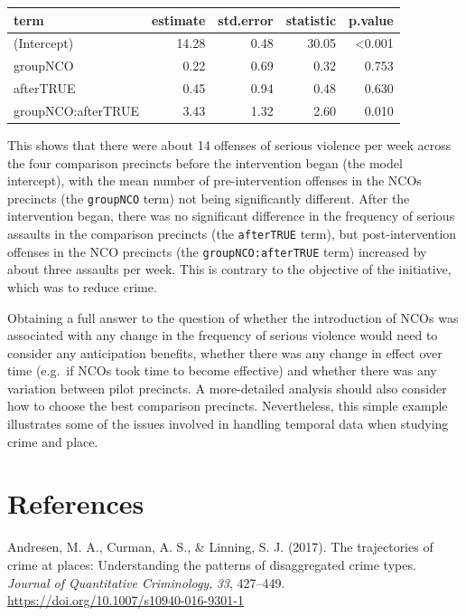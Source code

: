 \documentclass[
  english,
  man,a4paper,mask,floatsintext]{apa6}
\begin{document}
\begin{tabular}{lrrrr}
\toprule
term & estimate & std.error & statistic & p.value\\
\midrule
(Intercept) & 14.28 & 0.48 & 30.05 & <0.001\\
groupNCO & 0.22 & 0.69 & 0.32 & 0.753\\
afterTRUE & 0.45 & 0.94 & 0.48 & 0.630\\
groupNCO:afterTRUE & 3.43 & 1.32 & 2.60 & 0.010\\
\bottomrule
\end{tabular}

\normalsize

This shows that there were about 14 offenses of serious violence per week across the four comparison precincts before the intervention began (the model intercept), with the mean number of pre-intervention offenses in the NCOs precincts (the \texttt{groupNCO} term) not being significantly different. After the intervention began, there was no significant difference in the frequency of serious assaults in the comparison precincts (the \texttt{afterTRUE} term), but post-intervention offenses in the NCO precincts (the \texttt{groupNCO:afterTRUE} term) increased by about three assaults per week. This is contrary to the objective of the initiative, which was to reduce crime.

Obtaining a full answer to the question of whether the introduction of NCOs was associated with any change in the frequency of serious violence would need to consider any anticipation benefits, whether there was any change in effect over time (e.g.~if NCOs took time to become effective) and whether there was any variation between pilot precincts. A more-detailed analysis should also consider how to choose the best comparison precincts. Nevertheless, this simple example illustrates some of the issues involved in handling temporal data when studying crime and place.

\hypertarget{references}{%
\section{References}\label{references}}

\footnotesize

\hypertarget{refs}{}
\leavevmode\hypertarget{ref-Andresen:2017aa}{}%
Andresen, M. A., Curman, A. S., \& Linning, S. J. (2017). The trajectories of crime at places: Understanding the patterns of disaggregated crime types. \emph{Journal of Quantitative Criminology}, \emph{33}, 427--449. \url{https://doi.org/10.1007/s10940-016-9301-1}
\end{document}
